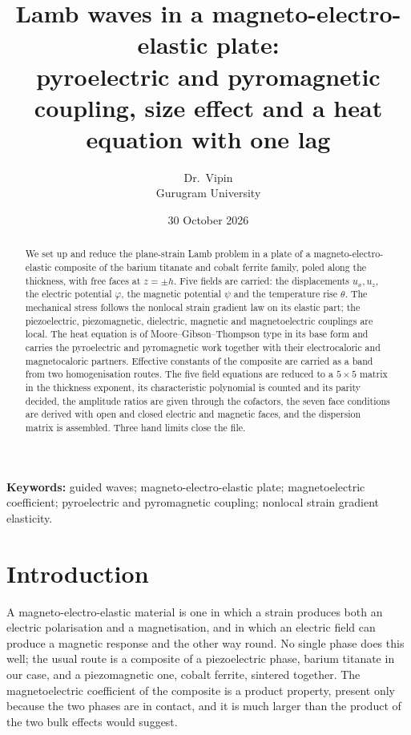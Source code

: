\documentclass[11pt]{article}
\title{\vspace{-1.2cm}Lamb waves in a magneto-electro-elastic plate:\\
pyroelectric and pyromagnetic coupling, size effect and a heat equation with one lag}
\author{Dr.\ Vipin \\ Gurugram University}
\date{30 October 2026}
\begin{document}
\maketitle

\begin{abstract}
\noindent
We set up and reduce the plane-strain Lamb problem in a plate of a magneto-electro-elastic composite of the
barium titanate and cobalt ferrite family, poled along the thickness, with free faces at $z=\pm h$. Five
fields are carried: the displacements $u_x,u_z$, the electric potential $\varphi$, the magnetic potential
$\psi$ and the temperature rise $\theta$. The mechanical stress follows the nonlocal strain gradient law on
its elastic part; the piezoelectric, piezomagnetic, dielectric, magnetic and magnetoelectric couplings are
local. The heat equation is of Moore--Gibson--Thompson type in its base form and carries the pyroelectric
and pyromagnetic work together with their electrocaloric and magnetocaloric partners. Effective constants of the composite are carried as a band from two homogenisation routes. The five field equations
are reduced to a $5\times5$ matrix in the thickness exponent, its characteristic polynomial is counted and
its parity decided, the amplitude ratios are given through the cofactors, the seven face conditions are
derived with open and closed electric and magnetic faces, and the dispersion matrix is assembled. Three
hand limits close the file.
\end{abstract}

\noindent\textbf{Keywords:} guided waves; magneto-electro-elastic plate; magnetoelectric coefficient;
pyroelectric and pyromagnetic coupling; nonlocal strain gradient elasticity.

\section{Introduction}

A magneto-electro-elastic material is one in which a strain produces both an electric polarisation and a
magnetisation, and in which an electric field can produce a magnetic response and the other way round. No
single phase does this well; the usual route is a composite of a piezoelectric phase, barium titanate in
our case, and a piezomagnetic one, cobalt ferrite, sintered together. The magnetoelectric coefficient of
the composite is a product property, present only because the two phases are in contact, and it is much
larger than the product of the two bulk effects would suggest.
\end{document}
